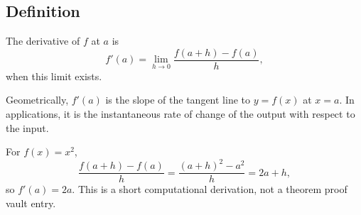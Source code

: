 \subsection*{Definition}

\begin{definition*}
The derivative of \(f\) at \(a\) is
\[
  f'(a)=\lim_{h\to 0}\frac{f(a+h)-f(a)}{h},
\]
when this limit exists.
\end{definition*}

\begin{remark*}
Geometrically, \(f'(a)\) is the slope of the tangent line to \(y=f(x)\) at
\(x=a\). In applications, it is the instantaneous rate of change of the
output with respect to the input.
\end{remark*}

\begin{example*}
For \(f(x)=x^2\),
\[
  \frac{f(a+h)-f(a)}{h}
    =\frac{(a+h)^2-a^2}{h}
    =2a+h,
\]
so \(f'(a)=2a\). This is a short computational derivation, not a theorem
proof vault entry.
\end{example*}
